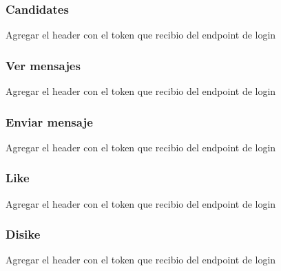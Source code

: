 \documentclass[letterpaper,10pt,english]{sphinxmanual}
\begin{document}
\subsubsection{Candidates}
\label{manuals:candidates}

Agregar el header con el token que recibio del endpoint de login



\subsubsection{Ver mensajes}
\label{manuals:ver-mensajes}

Agregar el header con el token que recibio del endpoint de login



\subsubsection{Enviar mensaje}
\label{manuals:enviar-mensaje}


Agregar el header con el token que recibio del endpoint de login



\subsubsection{Like}
\label{manuals:like}

Agregar el header con el token que recibio del endpoint de login



\subsubsection{Disike}
\label{manuals:disike}

Agregar el header con el token que recibio del endpoint de login

\end{document}
